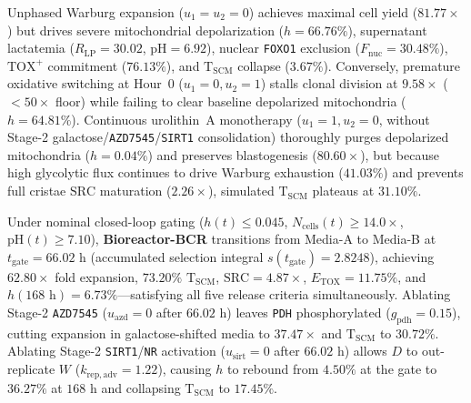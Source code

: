 \documentclass[11pt]{article}
\theoremstyle{plain}
\theoremstyle{remark}
\begin{document}
Unphased Warburg expansion ($u_1 = u_2 = 0$) achieves maximal cell yield ($81.77\times$) but drives severe mitochondrial depolarization ($h = 66.76\%$), supernatant lactatemia ($R_{\mathrm{LP}} = 30.02$, $\mathrm{pH} = 6.92$), nuclear \texttt{FOXO1} exclusion ($F_{\mathrm{nuc}} = 30.48\%$), $\text{TOX}^+$ commitment ($76.13\%$), and $\mathrm{T}_{\mathrm{SCM}}$ collapse ($3.67\%$). Conversely, premature oxidative switching at Hour~0 ($u_1 = 0, u_2 = 1$) stalls clonal division at $9.58\times$ ($<50\times$ floor) while failing to clear baseline depolarized mitochondria ($h = 64.81\%$). Continuous urolithin~A monotherapy ($u_1 = 1, u_2 = 0$, without Stage-2 galactose/\texttt{AZD7545}/\texttt{SIRT1} consolidation) thoroughly purges depolarized mitochondria ($h = 0.04\%$) and preserves blastogenesis ($80.60\times$), but because high glycolytic flux continues to drive Warburg exhaustion ($41.03\%$) and prevents full cristae $\mathrm{SRC}$ maturation ($2.26\times$), simulated $\mathrm{T}_{\mathrm{SCM}}$ plateaus at $31.10\%$.

Under nominal closed-loop gating ($h(t) \le 0.045$, $N_{\mathrm{cells}}(t) \ge 14.0\times$, $\mathrm{pH}(t) \ge 7.10$), \textbf{Bioreactor-BCR} transitions from Media-A to Media-B at $t_{\mathrm{gate}} = 66.02\text{ h}$ (accumulated selection integral $s(t_{\mathrm{gate}}) = 2.8248$), achieving $62.80\times$ fold expansion, $73.20\%$ $\mathrm{T}_{\mathrm{SCM}}$, $\mathrm{SRC} = 4.87\times$, $E_{\mathrm{TOX}} = 11.75\%$, and $h(168\text{ h}) = 6.73\%$---satisfying all five release criteria simultaneously. Ablating Stage-2 \texttt{AZD7545} ($u_{\mathrm{azd}} = 0$ after $66.02\text{ h}$) leaves \texttt{PDH} phosphorylated ($g_{\mathrm{pdh}} = 0.15$), cutting expansion in galactose-shifted media to $37.47\times$ and $\mathrm{T}_{\mathrm{SCM}}$ to $30.72\%$. Ablating Stage-2 \texttt{SIRT1}/\texttt{NR} activation ($u_{\mathrm{sirt}} = 0$ after $66.02\text{ h}$) allows $D$ to out-replicate $W$ ($k_{\mathrm{rep,adv}} = 1.22$), causing $h$ to rebound from $4.50\%$ at the gate to $36.27\%$ at $168\text{ h}$ and collapsing $\mathrm{T}_{\mathrm{SCM}}$ to $17.45\%$.
\end{document}
